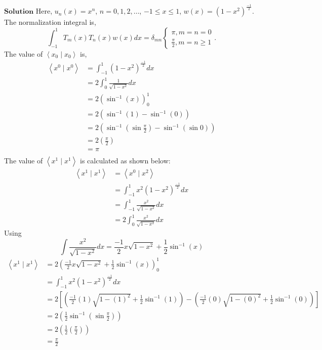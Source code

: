 $\boxed{\textbf{Solution}}$ Here, $u_{n}(x)=x^{n}$, $n=0,1,2, \ldots$, $-1 \leq x \leq 1$, $w(x)=\left(1-x^{2}\right)^{\frac{-1}{2}}$. The normalization integral is,
$$\int_{-1}^{1} T_{m}(x) T_{n}(x) w(x) d x=\delta_{m n}\left\{\begin{array}{l}\pi, m=n=0 \\ \frac{\pi}{2}, m=n \geq 1\end{array} .\right.$$
The value of $\left\langle x_{0} \mid x_{0}\right\rangle$ is,
$$
\begin{aligned}\left\langle x^{0} \mid x^{0}\right\rangle &=\int_{-1}^{1}\left(1-x^{2}\right)^{\frac{-1}{2}} d x \\ &=2 \int_{0}^{1} \frac{1}{\sqrt{1-x^{2}}} d x \\ &=2\left(\sin ^{-1}(x)\right)_{0}^{1} \\ &=2\left(\sin ^{-1}(1)-\sin ^{-1}(0)\right)\\
&=2\left(\sin ^{-1}\left(\sin \frac{\pi}{2}\right)-\sin ^{-1}(\sin 0)\right) \\
&=2\left(\frac{\pi}{2}\right) \\
&=\pi \\
\end{aligned}
$$
The value of $\left\langle x^{1} \mid x^{1}\right\rangle$ is calculated as shown below:
$$
\begin{aligned}
\left\langle x^{1} \mid x^{1}\right\rangle &=\left\langle x^{0} \mid x^{2}\right\rangle \\
&=\int_{-1}^{1} x^{2}\left(1-x^{2}\right)^{\frac{-1}{2}} d x \\
&=\int_{-1}^{1} \frac{x^{2}}{\sqrt{1-x^{2}}} d x \\
&=2 \int_{0}^{1} \frac{x^{2}}{\sqrt{1-x^{2}}} d x 
\end{aligned}
$$
Using
$$
\int \frac{x^{2}}{\sqrt{1-x^{2}}} d x=\frac{-1}{2} x \sqrt{1-x^{2}}+\frac{1}{2} \sin ^{-1}(x)
$$
$$
\begin{aligned}
\left\langle x^{1} \mid x^{1}\right\rangle &=2\left(\frac{-1}{2} x \sqrt{1-x^{2}}+\frac{1}{2} \sin ^{-1}(x)\right)_{0}^{1}\\
&=\int_{-1}^{1} x^{2}\left(1-x^{2}\right)^{\frac{-1}{2}} d x \\
&=2\left[\left(\frac{-1}{2}(1) \sqrt{1-(1)^{2}}+\frac{1}{2} \sin ^{-1}(1)\right)-\left(\frac{-1}{2}(0) \sqrt{1-(0)^{2}}+\frac{1}{2} \sin ^{-1}(0)\right)\right] \\
&=2\left(\frac{1}{2} \sin ^{-1}\left(\sin \frac{\pi}{2}\right)\right) \\
&=2\left(\frac{1}{2}\left(\frac{\pi}{2}\right)\right) \\
&=\frac{\pi}{2} \\
\end{aligned}
$$
